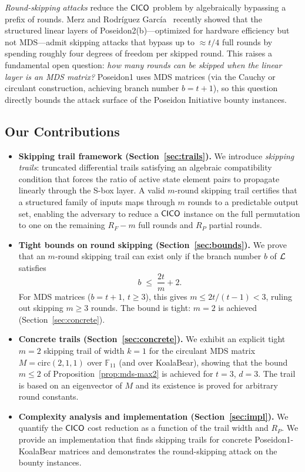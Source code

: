 \documentclass[11pt]{article}
\begin{document}
\emph{Round-skipping attacks} reduce the $\mathsf{CICO}$ problem by algebraically bypassing a prefix of rounds. Merz and Rodr{\'{i}}guez Garc{\'{i}}a~\cite{skip2026} recently showed that the structured linear layers of Poseidon2(b)---optimized for hardware efficiency but not MDS---admit skipping attacks that bypass up to $\approx t/4$ full rounds by spending roughly four degrees of freedom per skipped round. This raises a fundamental open question: \emph{how many rounds can be skipped when the linear layer is an MDS matrix?} Poseidon1 uses MDS matrices (via the Cauchy or circulant construction, achieving branch number $b = t+1$), so this question directly bounds the attack surface of the Poseidon Initiative bounty instances.

\subsection*{Our Contributions}

\begin{itemize}
    \item \textbf{Skipping trail framework (Section~\ref{sec:trails}).}
    We introduce \emph{skipping trails}: truncated differential trails satisfying an algebraic compatibility condition that forces the ratio of active state element pairs to propagate linearly through the S-box layer. A valid $m$-round skipping trail certifies that a structured family of inputs maps through $m$ rounds to a predictable output set, enabling the adversary to reduce a $\mathsf{CICO}$ instance on the full permutation to one on the remaining $R_F - m$ full rounds and $R_P$ partial rounds.

    \item \textbf{Tight bounds on round skipping (Section~\ref{sec:bounds}).}
    We prove that an $m$-round skipping trail can exist only if the branch number $b$ of $\mathcal{L}$ satisfies
    \[
        b \;\leq\; \frac{2t}{m} + 2.
    \]
    For MDS matrices ($b = t+1$, $t\geq 3$), this gives $m\leq 2t/(t-1)<3$, ruling out skipping $m\geq 3$ rounds.
    The bound is tight: $m=2$ is achieved (Section~\ref{sec:concrete}).

    \item \textbf{Concrete trails (Section~\ref{sec:concrete}).}
    We exhibit an explicit tight $m=2$ skipping trail of width $k=1$ for the circulant MDS matrix
    $M=\mathrm{circ}(2,1,1)$ over $\mathbb{F}_{11}$ (and over KoalaBear), showing that the bound
    $m\leq 2$ of Proposition~\ref{prop:mds-max2} is achieved for $t=3$, $d=3$.
    The trail is based on an eigenvector of $M$ and its existence is proved for
    arbitrary round constants.

    \item \textbf{Complexity analysis and implementation (Section~\ref{sec:impl}).}
    We quantify the $\mathsf{CICO}$ cost reduction as a function of the trail width and $R_P$. We provide an implementation that finds skipping trails for concrete Poseidon1-KoalaBear matrices and demonstrates the round-skipping attack on the bounty instances.
\end{itemize}
\end{document}
